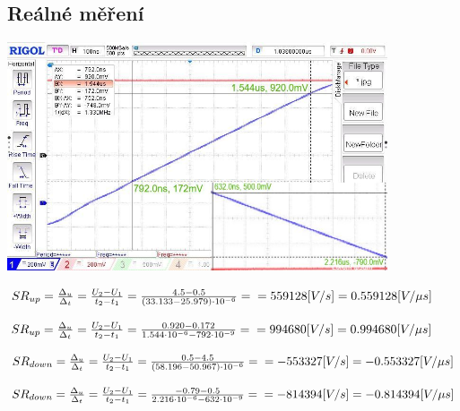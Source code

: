 \documentclass{article}
\begin{document}
\begin{figure}[H]
\begin{minipage}[t]{0.5\textwidth}
    \subsection*{Reálné měření}
    \includegraphics[width=\textwidth]{LAB/NewFile03.jpg}
  \end{minipage}
\vspace{5mm}
  \begin{minipage}[t]{0.5\textwidth}
    \(
      SR_{up} = \frac{\Delta_u}{\Delta_t} = \frac{U_2-U_1}{t_2-t_1} = \frac{4.5-0.5}{(33.133-25.979)\cdot 10^{-6}} =\\= 559128\-[V/s] = 0.559128\-[V/\mu s]
    \) 
  \end{minipage}
  \hfill
  \begin{minipage}[t]{0.5\textwidth}
    \(
      SR_{up} = \frac{\Delta_u}{\Delta_t} = \frac{U_2-U_1}{t_2-t_1} = \frac{0.920-0.172}{1.544\cdot 10^{-6}-792\cdot 10^{-9}} =\\= 994680\-[V/s] = 0.994680\-[V/\mu s]
    \) 
  \end{minipage}
\vspace{5mm}
  \begin{minipage}[t]{0.5\textwidth}
    \(
      SR_{down} = \frac{\Delta_u}{\Delta_t} = \frac{U_2-U_1}{t_2-t_1} = \frac{0.5-4.5}{(58.196-50.967)\cdot 10^{-6}} =\\= -553327\-[V/s] = -0.553327\-[V/\mu s]
    \)
  \end{minipage}
  \hfill
  \begin{minipage}[t]{0.5\textwidth}
    \(
      SR_{down} = \frac{\Delta_u}{\Delta_t} = \frac{U_2-U_1}{t_2-t_1} = \frac{-0.79-0.5}{2.216\cdot 10^{-6}-632\cdot 10^{-9}} =\\= -814394\-[V/s] = -0.814394\-[V/\mu s]
    \)
  \end{minipage}
\end{figure}
\end{document}
